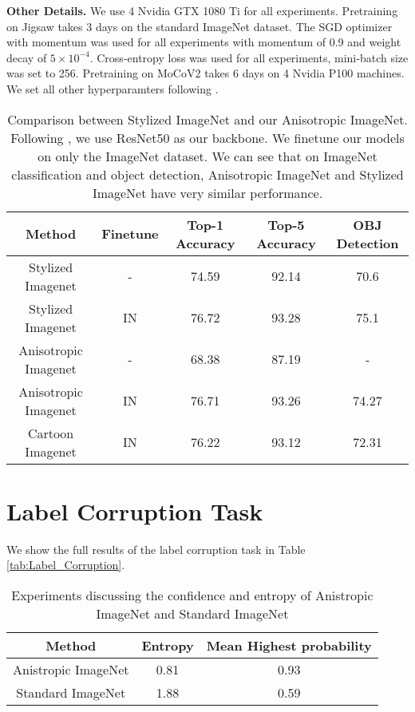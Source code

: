 \documentclass{bmvc2k}
\begin{document}
\noindent\textbf{Other Details.}
We use 4 Nvidia GTX 1080 Ti for all experiments.
Pretraining on Jigsaw takes 3 days on the standard ImageNet dataset. The SGD optimizer with momentum was used for all experiments with momentum of 0.9 and weight decay of $5\times10^{-4}$. Cross-entropy loss was used for all experiments, mini-batch size was set to 256. Pretraining on MoCoV2 takes 6 days on 4 Nvidia P100 machines. We set all other hyperparamters following \cite{chen2020improved}.

\begin{table*}[t!]
\centering
\caption{Comparison between Stylized ImageNet and our Anisotropic ImageNet. Following \cite{Geirhos2018ImageNettrainedCA}, we use ResNet50 as our backbone. We finetune our models on only the ImageNet dataset. We can see that on ImageNet classification and object detection, Anisotropic ImageNet and Stylized ImageNet have very similar performance.}
\label{tab: Stylized_Classification_experiments}
\begin{tabular}{ccccc}  
\toprule
Method    & Finetune & Top-1 Accuracy & Top-5 Accuracy & OBJ Detection \\
\midrule
Stylized Imagenet     & - & 74.59    & 92.14 &  70.6   \\
Stylized Imagenet    & IN & 76.72    & 93.28 &  75.1  \\
Anisotropic Imagenet   & - & 68.38    & 87.19 & -\\
Anisotropic Imagenet   & IN & 76.71    & 93.26 &   74.27 \\

Cartoon Imagenet   & IN & 76.22    & 93.12 & 72.31   \\
\bottomrule
\end{tabular}
\end{table*}








\section{Label Corruption Task}
We show the full results of the label corruption task in Table \ref{tab:Label_Corruption}.

\begin{table*}
\begin{center}
\caption{Experiments discussing the confidence and entropy of Anistropic ImageNet and Standard ImageNet}
\begin{tabular}{ccc} 
\toprule
Method    & Entropy & Mean Highest probability \\
\midrule
Anistropic ImageNet     & 0.81 & 0.93   \\
Standard ImageNet   & 1.88 & 0.59   \\
\bottomrule
\end{tabular}
\label{tab: Confidence_Experiments}
\end{center}
\end{table*}
\end{document}
